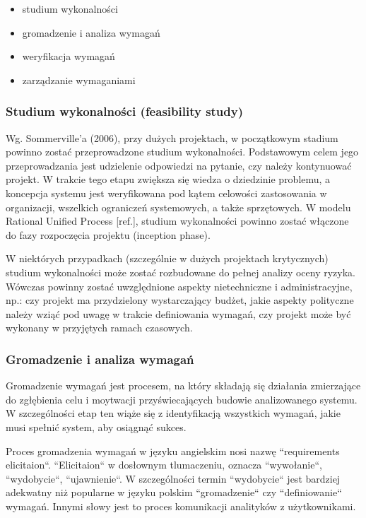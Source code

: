       \begin{itemize} 
          \item studium wykonalności 
          \item gromadzenie i analiza wymagań
          \item weryfikacja wymagań
          \item zarządzanie wymaganiami
      \end{itemize}

      \subsubsection{Studium wykonalności (feasibility study)}

        Wg. Sommerville'a (2006), przy dużych projektach, w początkowym stadium powinno zostać przeprowadzone studium wykonalności. Podstawowym celem jego przeprowadzania jest udzielenie odpowiedzi na pytanie, czy należy kontynuować projekt. W trakcie tego etapu zwiększa się wiedza o dziedzinie problemu, a koncepcja systemu jest weryfikowana pod kątem celowości zastosowania w organizacji, wszelkich ograniczeń systemowych, a także sprzętowych. W modelu Rational Unified Process [ref.], studium wykonalności powinno zostać włączone do fazy rozpoczęcia projektu (inception phase).

        W niektórych przypadkach (szczególnie w dużych projektach krytycznych) studium wykonalności może zostać rozbudowane do pełnej analizy oceny ryzyka. Wówczas powinny zostać uwzględnione aspekty nietechniczne i administracyjne, np.: czy projekt ma przydzielony wystarczający budżet, jakie aspekty polityczne należy wziąć pod uwagę w trakcie definiowania wymagań, czy projekt może być wykonany w przyjętych ramach czasowych.

      \subsubsection{Gromadzenie i analiza wymagań}

        Gromadzenie wymagań jest procesem, na który składają się działania zmierzające do zgłębienia celu i moytwacji przyświecających budowie analizowanego systemu. W szczególności etap ten wiąże się z identyfikacją wszystkich wymagań, jakie musi spełnić system, aby osiągnąć sukces.
        
        Proces gromadzenia wymagań w języku angielskim nosi nazwę ``requirements elicitaion``. ``Elicitaion`` w dosłownym tlumaczeniu, oznacza ``wywołanie``, ``wydobycie``, ``ujawnienie``. W szczególności termin ``wydobycie`` jest bardziej adekwatny niż popularne w języku polskim ``gromadzenie`` czy ``definiowanie`` wymagań. Innymi słowy jest to proces komunikacji analityków z użytkownikami. 

